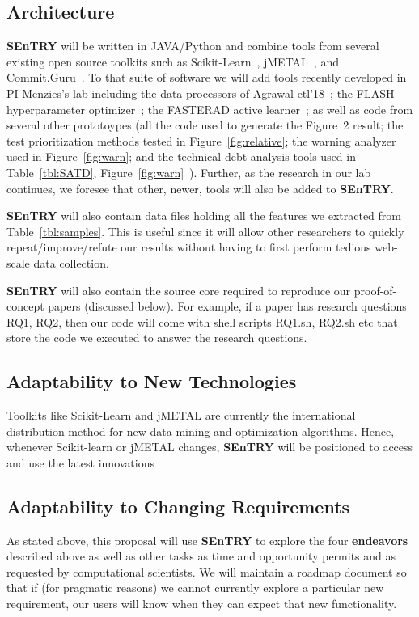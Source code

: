 \documentclass{NSF}
\newcommand{\tbl}[1]{Table~\ref{tbl:#1}}
\newcommand{\fig}[1]{Figure~\ref{fig:#1}}
\newcommand{\IT}{{\bf {\sffamily SEnTRY}}}
\begin{document}
\begin{nsfdescription}
\subsection{Architecture}   {\IT} will be written in JAVA/Python and 
combine tools from several existing open source toolkits such as 
Scikit-Learn~\cite{scikit-learn}, jMETAL~\cite{durillo2011jmetal}, and Commit.Guru~\cite{commitguru}.
To that suite of software we will add tools recently developed in PI Menzies's lab including
the data processors of Agrawal etl'18~\cite{agrawal2017better}; 
the FLASH hyperparameter  optimizer~\cite{nair2017flash};
the FASTERAD active learner~\cite{Yu:2018,Yu2019}; as well as code
from several other prototoypes (all the code used to generate the    Figure~2 result;
the test prioritization methods tested in \fig{relative};  
the warning analyzer used in    \fig{warn};  
and the technical debt analysis tools used in \tbl{SATD},
\fig{warn}~\cite{xia19}). Further, as the research in our lab continues,
we foresee that other, newer, tools will also be added to {\IT}.





{\IT} will also contain data files holding all the features we extracted from \tbl{samples}. This is useful
since it will allow other researchers to quickly repeat/improve/refute our results without having
to first perform tedious web-scale data collection.

{\IT} will also contain the source core required to reproduce 
our proof-of-concept papers (discussed below). For example, if  a  paper
has research questions RQ1, RQ2, then our code will come with shell scripts
 RQ1.sh, RQ2.sh etc that store the code we executed to answer the research questions.


\subsection{Adaptability to New Technologies} Toolkits like Scikit-Learn and jMETAL
  are currently the international distribution method
for new data mining and optimization
algorithms. Hence, whenever Scikit-learn or jMETAL changes, {\IT} will be positioned to access
and use the  latest innovations  

\subsection{Adaptability to Changing Requirements}
As stated above, this proposal will use {\IT} to explore the four {\bf endeavors}
described above as well as  other tasks as time and opportunity permits and as requested by computational scientists.
We will maintain a roadmap document so that if (for pragmatic reasons)
we cannot currently explore a particular new requirement,
our users will know when they can expect that new functionality.



\end{nsfdescription}
\end{document}
